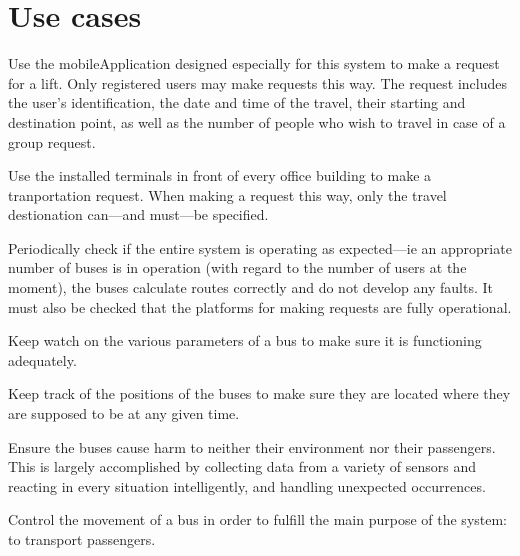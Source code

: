 \documentclass[a4paper]{article}
\begin{document}
\section{Use cases}

\begin{description}[style=nextline]
	\item[Make \gls{request} via \gls{mobileApplication}]
		Use the \gls{mobileApplication} designed especially for this
		system to make a \gls{request} for a lift. Only registered users
		may make \gls{request}s this way. The \gls{request} includes the
		user's identification, the date and time of the travel, their
		starting and destination point, as well as the number of people
		who wish to travel in case of a group \gls{request}.

	\item[Make \gls{request} via \gls{terminal}]
		Use the installed \gls{terminal}s in front of every office
		building to make a tranportation \gls{request}. When making a
		\gls{request} this way, only the travel destionation can—and
		must—be specified.

	\item[Monitor system status]
		Periodically check if the entire system is operating as
		expected—ie an appropriate number of buses is in operation (with
		regard to the number of users at the moment), the buses
		calculate \gls{route}s correctly and do not develop any faults.
		It must also be checked that the platforms for making
		\gls{request}s are fully operational.

	\item[Monitor bus condition]
		Keep watch on the various parameters of a bus to make sure it is
		functioning adequately.

	\item[Monitor bus position]
		Keep track of the positions of the buses to make sure they are
		located where they are supposed to be at any given time.

	\item[Avoid causing accidents]
		Ensure the buses cause harm to neither their environment nor
		their passengers. This is largely accomplished by collecting
		data from a variety of \gls{sensor}s and reacting in every
		situation intelligently, and handling unexpected occurrences.

	\item[Drive bus]
		Control the movement of a bus in order to fulfill the main
		purpose of the system: to transport passengers.


\end{description}
\end{document}
